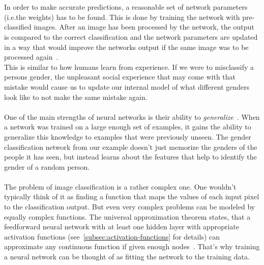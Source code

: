 \\
\\
In order to make accurate predictions, a reasonable set of network parameters (i.e.the weights) has to be found.
This is done by training the network with pre-classified images.
After an image has been processed by the network, the output is compared to the correct classification and the network parameters are updated in a way that would improve the networks output if the same image was to be processed again~\cite[chapter 1.2]{aggarwal_neural_2018,ibm_nn}.
\\
This is similar to how humans learn from experience.
If we were to misclassify a persons gender, the unpleasant social experience that may come with that mistake would cause us to update our internal model of what different genders look like to not make the same mistake again.
\\
\\
One of the main strengths of neural networks is their ability to \textit{generalize}~\cite{gonfalonieri_understand_2020}.
When a network was trained on a large enough set of examples, it gains the ability to generalize this knowledge to examples that were previously unseen.
The gender classification network from our example doesn't just memorize the genders of the people it has seen, but instead learns about the features that help to identify the gender of a random person.
\\
\\
The problem of image classification is a rather complex one.
One wouldn't typically think of it as finding a function that maps the values of each input pixel to the classification output.
But even very complex problems can be modeled by equally complex functions.
The universal approximation theorem states, that a feedforward neural network with at least one hidden layer with appropriate activation functions (see~\ref{subsec:activation-functions} for details) can approximate any continuous function if given enough nodes~\cite[chapter 6.4.1]{goodfellow_deep_2016}.
That's why training a neural network can be thought of as fitting the network to the training data.
\\
